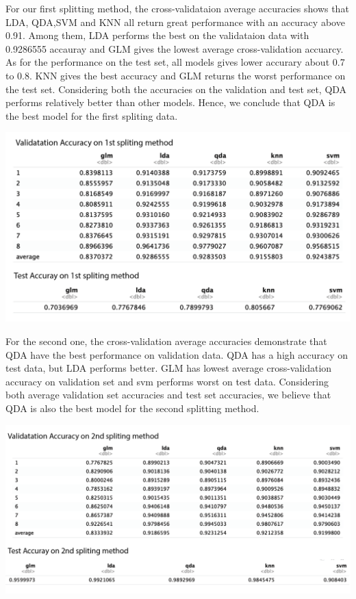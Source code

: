 \documentclass[11pt]{article}
\begin{document}
For our first splitting method, the cross-validataion average accuracies shows that LDA, QDA,SVM and KNN all return  great performance with an accuracy above 0.91. Among them, LDA performs the best on the validataion data with 0.9286555 accauray and GLM gives the lowest average cross-validation accuarcy. As for the performance on the test set, all models gives lower accurary about 0.7 to 0.8. KNN gives the best accuracy and GLM returns the worst performance on the test set. Considering both the accuracies on the validation and test set, QDA performs relatively better than other models. Hence, we conclude that QDA is the best model for the first spliting data.  

\includegraphics[width = 15.5cm]{3(a)1acuracy}

For the second one, the cross-validation average accuracies demonstrate that QDA have the best performance on validation data. QDA has a high accuracy on test data, but LDA performs better. GLM has lowest average cross-validation accuracy on validation set and svm performs worst on test data. Considering both average validation set accuracies and test set accuracies, we believe that QDA is also the best model for the second splitting method.

\includegraphics[width = 15.5cm]{3(a)2acuracy}
\end{document}
